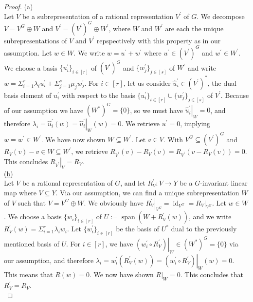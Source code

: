 \begin{proof}
  \hfill \break
  \underline{(a)}\\
  Let $V$ be a subrepresentation of a rational representation $V^\prime$ of $G$.
  We decompose $V = V^G \oplus W$ and $V^\prime = (V^\prime)^G \oplus W^\prime$, where $W$ and $W^\prime$ are each the unique subrepresentations of $V$ and $V^\prime$ repspectively with this property as in our assumption.
  Let $w \in W$.
  We write $w = u^\prime + w^\prime$ where $u^\prime \in (V^\prime)^G$ and $w^\prime \in W^\prime$.
  We choose a basis $\{u^\prime_i\}_{i \in [r]}$ of $(V^\prime)^G$ and $\{w^\prime_j\}_{j \in [s]}$ of $W^\prime$ and write $w = \Sigma_{i=1}^r \lambda_i u^\prime_i + \Sigma_{j=1}^s \mu_j w^\prime_j$.
  For $i \in [r]$, let us consider $\hat{u}^\prime_i \in (V^\prime)^\ast$, the dual basis element of $u^\prime_i$ with respect to the basis $\{u^\prime_i\}_{i \in [r]} \cup \{w^\prime_j\}_{j \in [s]}$ of $V^\prime$.
  Because of our assumption we have $(W^\ast)^G = \{0\}$, so we must have $\left. \hat{u}^\prime_i \right|_W = 0$, and therefore $\lambda_i = \hat{u}^\prime_i (w) = \left. \hat{u}^\prime_i \right|_W (w) = 0$.
  We retrieve $u^\prime = 0$, implying $ w  = w^\prime \in W^\prime $.
  We have now shown $W \subseteq W^\prime$.
  Let $v \in V$.
  With $V^G \subseteq (V^\prime)^G$ and $R_V (v) - v \in W \subseteq W^\prime$, we retrieve $R_{V^\prime}(v) - R_V (v) = R_{V^\prime}(v - R_V(v)) = 0$.
  This concludes $\left. R_{V^\prime} \right|_V = R_V$.  \\
  \underline{(b)}\\
  Let $V$ be a rational representation of $G$, and let $R^\prime_V \colon V \rightarrow Y$ be a $G$-invariant linear map where $V \subseteq Y$.
  Via our assumption, we can find a unique subrepresentation $W$ of $V$ such that $V = V^G \oplus W$.
  We obviously have $\left. R^\prime_V \right|_{V^G} = \operatorname{id}_{V^G} = \left. R_V \right|_{V^G}$.
  Let $w \in W$.
  We choose a basis $\{w_i\}_{i \in [r]}$ of $U:= \operatorname{span}(W + R^\prime_V (w))$, and we write $R^\prime_V (w) = \Sigma_{i=1}^r \lambda_i w_i$.
  Let $\{w^\prime_i\}_{i \in [r]}$ be the basis of $U^\ast$ dual to the previously mentioned basis of $U$.
  For $i \in [r]$, we have $\left. (w^\prime_i \circ R^\prime_V) \right|_W \in (W^\ast)^G = \{0\}$ via our assumption, and therefore $ \lambda_i = w^\prime_i (R^\prime_V(w)) = \left. (w^\prime_i \circ R^\prime_V) \right|_W (w) = 0$.
  This means that $R(w) = 0$.
  We now have shown $\left. R \right|_{W} = 0$.
  This concludes that $R^\prime_V = R_V$.  \\

\end{proof}

